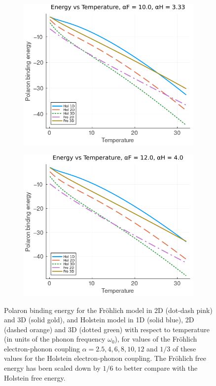 \begin{figure}[!tbp]
\begin{subfigure}[b]{0.49\textwidth}
    \includegraphics[width=\textwidth]{figures/energy_temp_10_333.png}
  \end{subfigure}
  \hfill
  \begin{subfigure}[b]{0.49\textwidth}
    \includegraphics[width=\textwidth]{figures/energy_temp_12_4.png}
  \end{subfigure}
  \caption{Polaron binding energy for the Fr\"ohlich model in 2D (dot-dash pink) and 3D (solid gold), and Holstein model in 1D (solid blue), 2D (dashed orange) and 3D (dotted green) with respect to temperature (in units of the phonon frequency $\omega_0$), for values of the Fr\"ohlich electron-phonon coupling $\alpha = 2.5, 4, 6, 8, 10, 12$ and $1/3$ of these values for the Holstein electron-phonon coupling. The Fr\"ohlich free energy has been scaled down by $1/6$ to better compare with the Holstein free energy.}
  \label{fig:energy_temp}
\end{figure}

